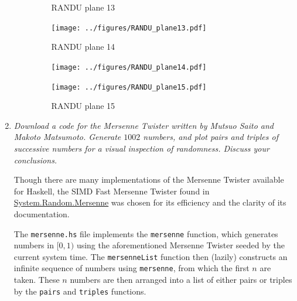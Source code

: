 \documentclass{article}
\begin{document}
\begin{enumerate}
\begin{enumerate}
\begin{figure}[H]
                    \centering
                    \begin{minipage}{.3\textwidth}
                        \centering
                        \caption{RANDU plane 13}
                        \texttt{[image: ../figures/RANDU\_plane13.pdf]}
                    \end{minipage}
                    \begin{minipage}{.3\textwidth}
                        \centering
                        \caption{RANDU plane 14}
                        \texttt{[image: ../figures/RANDU\_plane14.pdf]}
                    \end{minipage}
                    \begin{minipage}{.3\textwidth}
                        \centering
                        \caption{RANDU plane 15}
                        \texttt{[image: ../figures/RANDU\_plane15.pdf]}
                    \end{minipage}
                \end{figure}
        \end{enumerate}
    \item
        {\it Download a code for the Mersenne Twister written by Mutsuo Saito and Makoto Matsumoto.
        Generate $1002$ numbers, and plot pairs and triples of successive numbers for a visual inspection of randomness. Discuss your conclusions.}

        Though there are many implementations of the Mersenne Twister available for Haskell,
        the SIMD Fast Mersenne Twister found in \href{https://hackage.haskell.org/package/mersenne-random}{System.Random.Mersenne}
        was chosen for its efficiency and the clarity of its documentation.

        The \texttt{mersenne.hs} file implements the \texttt{mersenne} function,
        which generates numbers in $[0, 1)$ using the aforementioned Mersenne Twister seeded by the current system time.
        The \texttt{mersenneList} function then (lazily) constructs an infinite sequence of numbers using \texttt{mersenne}, from which the first $n$ are taken.
        These $n$ numbers are then arranged into a list of either pairs or triples by the \texttt{pairs} and \texttt{triples} functions.


\end{enumerate}
\end{document}
